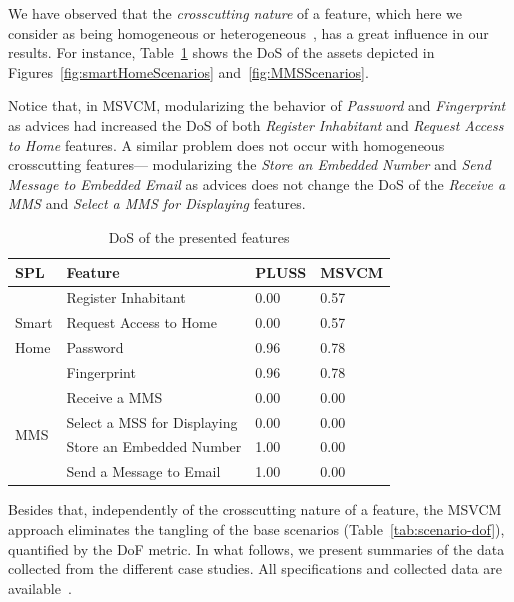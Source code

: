 \documentclass{sig-alt-full}
\begin{document}
We have observed that the \emph{crosscutting nature} of a feature, which here we
consider as being homogeneous or heterogeneous~\cite{Apel:2006aa}, has a great influence in our
results. For instance, Table~\ref{tab:feature-dos} shows the DoS of
the assets depicted in Figures~\ref{fig:smartHomeScenarios}
and~\ref{fig:MMSScenarios}. 

Notice that, in MSVCM, modularizing the behavior
of \emph{Password} and \emph{Fingerprint} as advices had
increased the DoS of both \emph{Register Inhabitant} and \emph{Request Access to
Home} features. A similar problem does not occur with homogeneous
crosscutting features--- modularizing the
\emph{Store an Embedded Number} and \emph{Send Message to Embedded Email} as advices does not 
change the DoS of the \emph{Receive a MMS} and \emph{Select a MMS for Displaying} features.    

\begin{table}[thb]
\centering
\caption{DoS of the presented features}
\label{tab:feature-dos}
\begin{small}
\begin{tabular}{p{0.25in}lll} \hline
SPL							&	Feature						& PLUSS	& MSVCM	\\ \hline 
 							&	Register Inhabitant				& 0.00  & 0.57  \\
Smart						&	Request Access to Home			& 0.00  & 0.57  \\ 
Home						&	Password						& 0.96  & 0.78  \\ 
							&	Fingerprint					& 0.96  & 0.78  \\ \hline
\multirow{4}{*}{MMS}	 		&	Receive a MMS				& 0.00  & 0.00  \\ 
							&	Select a MSS for Displaying		& 0.00  & 0.00  \\ 
							& 	Store an Embedded Number		& 1.00  & 0.00  \\
							& 	Send a Message to Email			& 1.00  & 0.00  \\ \hline		
\end{tabular}
\end{small}
\end{table}

Besides that, independently of the crosscutting nature of a feature, the
MSVCM approach eliminates the tangling of the base scenarios (Table~\ref{tab:scenario-dof}), quantified by the DoF metric.  In what follows, we present summaries of the data collected from the different case studies. All specifications and collected data are available~\cite{SPG:site}.
\end{document}
